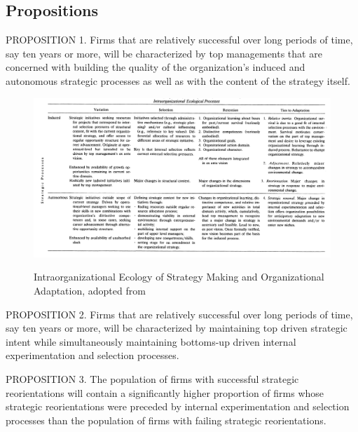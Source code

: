\documentclass[12pt,letterpaper]{article}
\begin{document}
\subsection{\cite{Burgelman1991} Propositions}
PROPOSITION 1. Firms that are relatively successful over long periods of time, say ten years or more, will be characterized by top managements that are concerned with building the quality of the organization's induced and autonomous strategic processes as well as with the content of the strategy itself.

\begin{figure}[h]
\begin{centering}
  \caption{Intraorganizational Ecology of Strategy Making and Organizational Adaptation, adopted from \cite{Burgelman1991}}
  \includegraphics[width=\textwidth]{Burgelman1991}
  \label{fig:Burgelman1991}
\end{centering}
\end{figure}

PROPOSITION 2. Firms that are relatively successful over long periods of time, say ten years or more, will be characterized by maintaining top driven strategic intent while simultaneously maintaining bottoms-up driven internal experimentation and selection processes.

PROPOSITION 3. The population of firms with successful strategic reorientations will contain a significantly higher proportion of firms whose strategic reorientations were preceded by internal experimentation and selection processes than the population of firms with failing strategic reorientations.
\end{document}
